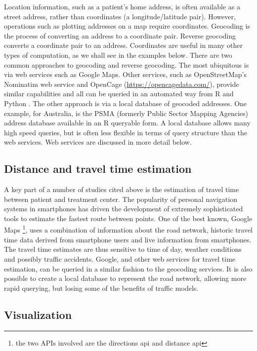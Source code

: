 \documentclass[utf8]{frontiersHLTH}
\begin{document}
Location information, such as a patient's home address, is often
available as a street address, rather than coordinates (a
longitude/latitude pair). However, operations such as plotting
addresses on a map require coordinates. Geocoding is the process of
converting an address to a coordinate pair. Reverse geocoding converts a
coordinate pair to an address. Coordinates are useful in many other types
of computation, as we shall see in the examples below. There are two
common approaches to geocoding and reverse geocoding. The most
ubiquitous is via web services such as Google Maps. Other services,
such as OpenStreetMap's Nominatim web service and OpenCage
(\url{https://opencagedata.com/}), provide similar capabilities and
all can be queried in an automated way from R and Python
\cite{opencage}. The other approach is via a local database of
geocoded addresses. One example, for Australia, is the PSMA (formerly
Public Sector Mapping Agencies) address database available in an R
queryable form. A local database allows many high speed queries, but
is often less flexible in terms of query structure than the web
services. Web services are discussed in more detail below.

\subsection{Distance and travel {\bf time} estimation}\label{distance-and-travel-estimation} 

A key part of a number of studies cited above is the estimation of
travel time between patient and treatment center. The popularity of
personal navigation systems in smartphones has driven the development
of extremely sophisticated tools to estimate the fastest route between
points. One of the best known, Google Maps \footnote{the two APIs
  involved are the directions api and distance api}, uses a
combination of information about the road network, historic travel
time data derived from smartphone users and live information from
smartphones. The travel time estimates are thus sensitive to time of
day, weather conditions and possibly traffic accidents. Google, and
other web services for travel time estimation, can be queried in a
similar fashion to the geocoding services. It is also possible to
create a local database to represent the road network, allowing more
rapid querying, but losing some of the benefits of traffic models.

\subsection{Visualization}\label{visualization} 
\end{document}
